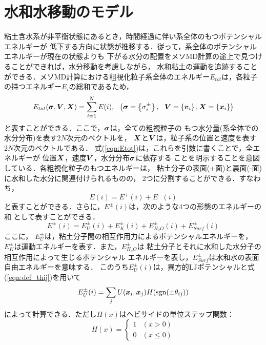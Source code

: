 ﻿\documentclass[11pt,a4j]{jarticle}
\begin{document}
\section{水和水移動のモデル}
粘土含水系が非平衡状態にあるとき，時間経過に伴い系全体のもつポテンシャルエネルギーが
低下する方向に状態が推移する．従って，系全体のポテンシャルエネルギーが現在の状態よりも
下がる水分の配置をメソMD計算の途上で見つけることができれば，水分移動を考慮しながら，
水和粘土の運動を追跡することができる．メソMD計算における粗視化粒子系全体のエネルギー$E_{tot}$は，各粒子の持つエネルギー$E_i$の総和であるため，
\begin{equation}
	E_{tot}(\fat{\sigma},\fat{V},\fat{X})=\sum_{i=1}^{N}E(i), 
	 \ \ 
	 \left( \fat{\sigma}=\left\{ \sigma^{\pm}_i \right\}
	 ,
	\ \
	 \fat{V}=\left\{ \fat{v}_i\right\}
, \fat{X}=\left\{\fat{x}_i \right\} 
	 \right)
	\label{eqn:Etot}
\end{equation}
と表すことができる．ここで，$\mbox{\boldmath $\sigma$}$は，全ての粗視粒子の
もつ水分量(系全体での水分分布)を表す$2N$次元のベクトルを，
$\mbox{\boldmath $X$}$と$\mbox{\boldmath $V$}$は，粒子系の位置と速度を表す$2N$次元のベクトルである．
式(\ref{eqn:Etot})は，これらを引数に書くことで，全エネルギーが
位置$\mbox{\boldmath $X$}$，速度$\mbox{\boldmath $V$}$，水分分布$\mbox{\boldmath $\sigma$}$に依存する
ことを明示することを意図している．各粗視化粒子のもつエネルギーは，
粘土分子の表面(+面)と裏面(-面)に水和した水分に関連付けられるものの，
2つに分割することができる．すなわち，
\begin{equation}
	E(i)=E^+(i)+E^-(i)
	\label{eqn:sum_Epm}
\end{equation}
と表すことができる．さらに，$E^\pm(i)$は，次のような4つの形態のエネルギーの和
として表すことができる．
\begin{equation}
	E^\pm(i)=E^\pm_{U}(i)+E^\pm_K(i)+E^\pm_{H_2O}(i)+E^\pm_{Surf}(i)
	\label{eqn:Emodes}
\end{equation}
ここに，
$E^{\pm}_U$は，粘土分子間の相互作用力によるポテンシャルエネルギーを，
$E^\pm_K$は運動エネルギーを表す．また，$E^\pm_{H_2O}$は
粘土分子とそれに水和した水分子の相互作用によって生じるポテンシャル
エネルギーを表し，$E^\pm_{Surf}$は水和水の表面自由エネルギーを意味する．
このうち$E^\pm_U(i)$は，異方的LJポテンシャルと式(\ref{eqn:def_thij})を用いて
\begin{equation}
	E_U^\pm(i)=\sum_{j} U(\mbox{\boldmath $x$}_i,\mbox{\boldmath $x$}_j)H({\rm sgn}(\pm \theta_{ij}))
	\label{eqn:def_EU}
\end{equation}
によって計算できる．ただし$H(x)$はヘビサイドの単位ステップ関数：
\begin{equation}
	H(x)=\left\{
	\begin{array}{cc}
		1& (x>0)  \\
		0& (x\leq 0) 
	\end{array}
	\right.
	\label{eqn:Step_func}
\end{equation}
\end{document}
